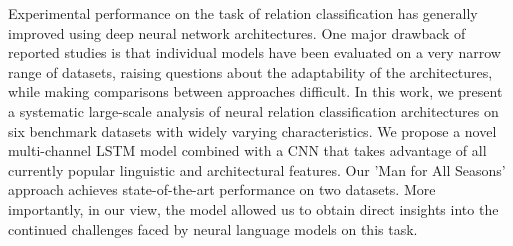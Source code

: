 Experimental performance on the task of relation classification has generally improved using deep neural network architectures. One major drawback of reported studies is that individual models have been evaluated on a very narrow range of datasets, raising questions about the adaptability of the architectures, while making comparisons between approaches difficult. In this work, we present a systematic large-scale analysis of neural relation classification architectures on six benchmark datasets with widely varying characteristics. We propose a novel multi-channel LSTM model combined with a CNN that takes advantage of all currently popular linguistic and architectural features. Our 'Man for All Seasons' approach achieves state-of-the-art performance on two datasets. More importantly, in our view, the model allowed us to obtain direct insights into the continued challenges faced by neural language models on this task.
